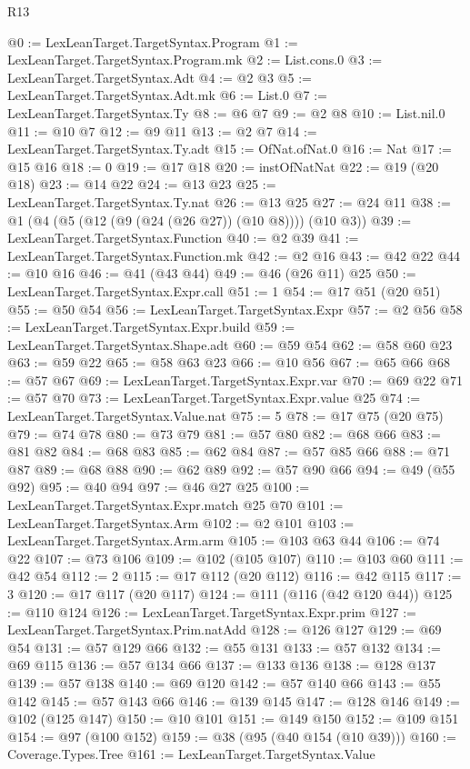 \begin{lexlean}{R13}
\begin{coremodule}
{{{{{{{{{{@0 := LexLeanTarget.TargetSyntax.Program
@1 := LexLeanTarget.TargetSyntax.Program.mk
@2 := List.cons.{0}
@3 := LexLeanTarget.TargetSyntax.Adt
@4 := @2 @3
@5 := LexLeanTarget.TargetSyntax.Adt.mk
@6 := List.{0}
@7 := LexLeanTarget.TargetSyntax.Ty
@8 := @6 @7
@9 := @2 @8
@10 := List.nil.{0}
@11 := @10 @7
@12 := @9 @11
@13 := @2 @7
@14 := LexLeanTarget.TargetSyntax.Ty.adt
@15 := OfNat.ofNat.{0}
@16 := Nat
@17 := @15 @16
@18 := 0
@19 := @17 @18
@20 := instOfNatNat
@22 := @19 (@20 @18)
@23 := @14 @22
@24 := @13 @23
@25 := LexLeanTarget.TargetSyntax.Ty.nat
@26 := @13 @25
@27 := @24 @11
@38 := @1 (@4 (@5 (@12 (@9 (@24 (@26 @27)) (@10 @8)))) (@10 @3))
@39 := LexLeanTarget.TargetSyntax.Function
@40 := @2 @39
@41 := LexLeanTarget.TargetSyntax.Function.mk
@42 := @2 @16
@43 := @42 @22
@44 := @10 @16
@46 := @41 (@43 @44)
@49 := @46 (@26 @11) @25
@50 := LexLeanTarget.TargetSyntax.Expr.call
@51 := 1
@54 := @17 @51 (@20 @51)
@55 := @50 @54
@56 := LexLeanTarget.TargetSyntax.Expr
@57 := @2 @56
@58 := LexLeanTarget.TargetSyntax.Expr.build
@59 := LexLeanTarget.TargetSyntax.Shape.adt
@60 := @59 @54
@62 := @58 @60 @23
@63 := @59 @22
@65 := @58 @63 @23
@66 := @10 @56
@67 := @65 @66
@68 := @57 @67
@69 := LexLeanTarget.TargetSyntax.Expr.var
@70 := @69 @22
@71 := @57 @70
@73 := LexLeanTarget.TargetSyntax.Expr.value @25
@74 := LexLeanTarget.TargetSyntax.Value.nat
@75 := 5
@78 := @17 @75 (@20 @75)
@79 := @74 @78
@80 := @73 @79
@81 := @57 @80
@82 := @68 @66
@83 := @81 @82
@84 := @68 @83
@85 := @62 @84
@87 := @57 @85 @66
@88 := @71 @87
@89 := @68 @88
@90 := @62 @89
@92 := @57 @90 @66
@94 := @49 (@55 @92)
@95 := @40 @94
@97 := @46 @27 @25
@100 := LexLeanTarget.TargetSyntax.Expr.match @25 @70
@101 := LexLeanTarget.TargetSyntax.Arm
@102 := @2 @101
@103 := LexLeanTarget.TargetSyntax.Arm.arm
@105 := @103 @63 @44
@106 := @74 @22
@107 := @73 @106
@109 := @102 (@105 @107)
@110 := @103 @60
@111 := @42 @54
@112 := 2
@115 := @17 @112 (@20 @112)
@116 := @42 @115
@117 := 3
@120 := @17 @117 (@20 @117)
@124 := @111 (@116 (@42 @120 @44))
@125 := @110 @124
@126 := LexLeanTarget.TargetSyntax.Expr.prim
@127 := LexLeanTarget.TargetSyntax.Prim.natAdd
@128 := @126 @127
@129 := @69 @54
@131 := @57 @129 @66
@132 := @55 @131
@133 := @57 @132
@134 := @69 @115
@136 := @57 @134 @66
@137 := @133 @136
@138 := @128 @137
@139 := @57 @138
@140 := @69 @120
@142 := @57 @140 @66
@143 := @55 @142
@145 := @57 @143 @66
@146 := @139 @145
@147 := @128 @146
@149 := @102 (@125 @147)
@150 := @10 @101
@151 := @149 @150
@152 := @109 @151
@154 := @97 (@100 @152)
@159 := @38 (@95 (@40 @154 (@10 @39)))
@160 := Coverage.Types.Tree
@161 := LexLeanTarget.TargetSyntax.Value
}}}}}}}}}}
\end{coremodule}
\end{lexlean}
